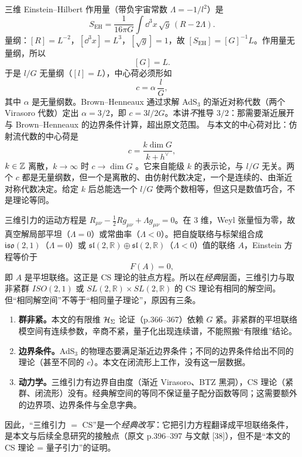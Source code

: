 \begin{derivation}[D-10.3：$c=3l/2G$ 的量纲检验，以及为什么不能与本文的 $c$ 混同]
三维 Einstein--Hilbert 作用量（带负宇宙常数 $\Lambda=-1/l^2$）是
\[
S_{\mathrm{EH}}=\frac{1}{16\pi G}\int\dd^3x\,\sqrt g\,(R-2\Lambda).
\]
量纲：$[R]=L^{-2}$，$[\dd^3x]=L^3$，$[\sqrt g]=1$，故 $[S_{\mathrm{EH}}]=[G]^{-1}L$。作用量无量纲，所以
\[
[G]=L .
\]
于是 $l/G$ 无量纲（$[l]=L$），中心荷必须形如
\[
c=\alpha\,\frac{l}{G},
\]
其中 $\alpha$ 是无量纲数。Brown--Henneaux 通过求解 AdS$_3$ 的渐近对称代数（两个 Virasoro 代数）定出 $\alpha=3/2$，即 $c=3l/2G$。本讲\emph{不}推导 $3/2$：那需要渐近展开与 Brown--Henneaux 的边界条件计算，超出原文范围。
与本文的中心荷对比：仿射流代数的中心荷是
\[
c=\frac{k\dim G}{k+h^\vee},
\]
$k\in\mathbb{Z}$ 离散，$k\to\infty$ 时 $c\to\dim G$ 。它来自能级 $k$ 的表示论，与 $l/G$ 无关。两个 $c$ 都是无量纲数，但一个是离散的、由仿射代数决定，一个是连续的、由渐近对称代数决定。给定 $k$ 后总能选一个 $l/G$ 使两个数相等，但这只是数值巧合，不是理论等同。\ours
\end{derivation}

\begin{derivation}[D-10.4：“三维引力 $=$ CS”为什么只是经典改写]
三维引力的运动方程是 $R_{\mu\nu}-\frac12Rg_{\mu\nu}+\Lambda g_{\mu\nu}=0$。在 3 维，Weyl 张量恒为零，故真空解局部平坦（$\Lambda=0$）或常曲率（$\Lambda<0$）。把自旋联络与标架组合成 $\mathfrak{iso}(2,1)$（$\Lambda=0$）或 $\mathfrak{sl}(2,\mathbb{R})\oplus\mathfrak{sl}(2,\mathbb{R})$（$\Lambda<0$）值的联络 $A$，Einstein 方程等价于
\[
F(A)=0 ,
\]
即 $A$ 是平坦联络。这正是 CS 理论的驻点方程。所以在\emph{经典}层面，三维引力与取非紧群 $ISO(2,1)$ 或 $SL(2,\mathbb{R})\times SL(2,\mathbb{R})$ 的 CS 理论有相同的解空间。
但“相同解空间”不等于“相同量子理论”，原因有三条。
\begin{enumerate}[label=(\alph*),leftmargin=*]
  \item \textbf{群非紧。}本文的有限维 $\mathcal{H}_\Sigma$ 论证（p.366--367）依赖 $G$ 紧。非紧群的平坦联络模空间有连续参数，辛商不紧，量子化出现连续谱，不能照搬“有限维”结论。
  \item \textbf{边界条件。}AdS$_3$ 的物理态要满足渐近边界条件；不同的边界条件给出不同的理论（甚至不同的 $c$）。本文在闭流形上工作，没有这一层数据。
  \item \textbf{动力学。}三维引力有边界自由度（渐近 Virasoro、BTZ 黑洞），CS 理论（紧群、闭流形）没有。经典解空间的等同不保证量子配分函数等同；这需要额外的边界项、边界条件与全息字典。
\end{enumerate}
因此，“三维引力 $=$ CS”是一个\emph{经典改写}：它把引力方程翻译成平坦联络条件，是本文与后续全息研究的接触点（原文 p.396--397 与文献 [38]），但不是“本文的 CS 理论 = 量子引力”的证明。\ours
\end{derivation}

